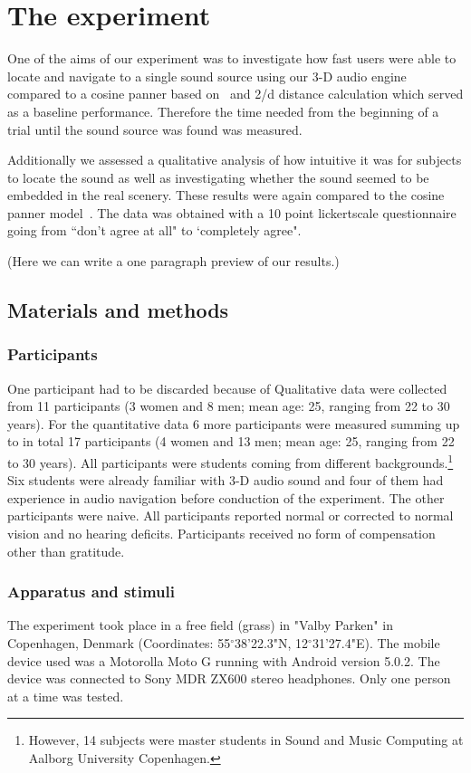 \documentclass[journal]{IEEEtran}
\begin{document}
\section{The experiment}
One of the aims of our experiment was to investigate how fast users were able to locate and navigate to a single sound source using our 3-D audio engine compared to a cosine panner based on~\cite{AndyFarnell2010} and 2/d distance calculation which served as a baseline performance. Therefore the time needed from the beginning of a trial until the sound source was found was measured. 

Additionally we assessed a qualitative analysis of how intuitive it was for subjects to locate the sound as well as investigating whether the sound seemed to be embedded in the real scenery. These results were again compared to the cosine panner model~\cite{AndyFarnell2010}. The data was obtained with a 10 point lickertscale questionnaire going from ``don't agree at all" to `completely agree".

(Here we can write a one paragraph preview of our results.)
\subsection{Materials and methods}
\subsubsection{Participants}
One participant had to be discarded because of 
Qualitative data were collected from 11 participants (3 women and 8 men; mean age: 25, ranging from 22 to 30 years). For the quantitative data 6 more participants were measured summing up to in total 17 participants (4 women and 13 men; mean age: 25, ranging from 22 to 30 years). All participants were students coming from different backgrounds.\footnote{However, 14 subjects were master students in Sound and Music Computing at Aalborg University Copenhagen.} Six students were already familiar with 3-D audio sound and four of them had experience in audio navigation before conduction of the experiment. The other participants were naive. All participants reported normal or corrected to normal vision and no hearing deficits. Participants received no form of compensation other than gratitude. 

\subsubsection{Apparatus and stimuli}
The experiment took place in a free field (grass) in "Valby Parken" in Copenhagen, Denmark (Coordinates: 55$^\circ$38'22.3"N, 12$^\circ$31'27.4"E). The mobile device used was a Motorolla Moto G running with Android version 5.0.2. The device was connected to Sony MDR ZX600 stereo headphones. Only one person at a time was tested. 
\end{document}
